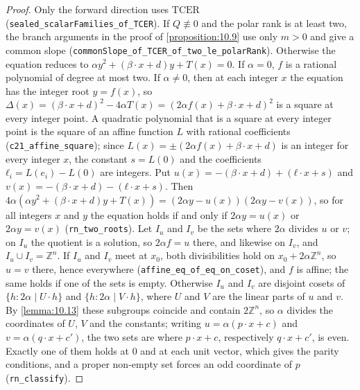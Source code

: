 \begin{proof}
Only the forward direction uses $\mathrm{TCER}$ (\texttt{sealed\_scalarFamilies\_of\_TCER}). If $Q ≢ 0$ and the polar rank is at least two, the branch arguments in the proof of \cref{proposition:10.9} use only $m > 0$ and give a common slope (\texttt{commonSlope\_of\_TCER\_of\_two\_le\_polarRank}). Otherwise the equation reduces to $αy^{2} + (β · x + d)y + T(x) = 0$. If $α = 0$, $f$ is a rational polynomial of degree at most two. If $α ≠ 0$, then at each integer $x$ the equation has the integer root $y = f(x)$, so $Δ(x) = (β · x + d)^{2} - 4αT(x) = (2αf(x) + β · x + d)^{2}$ is a square at every integer point. A quadratic polynomial that is a square at every integer point is the square of an affine function $L$ with rational coefficients (\texttt{c21\_affine\_square}); since $L(x) = ±(2αf(x) + β · x + d)$ is an integer for every integer $x$, the constant $s = L(0)$ and the coefficients $ℓ_{i} = L(e_{i}) - L(0)$ are integers. Put $u(x) = -(β · x + d) + (ℓ · x + s)$ and $v(x) = -(β · x + d) - (ℓ · x + s)$. Then $4α(αy^{2} + (β · x + d)y + T(x)) = (2αy - u(x))(2αy - v(x))$, so for all integers $x$ and $y$ the equation holds if and only if $2αy = u(x)$ or $2αy = v(x)$ (\texttt{rn\_two\_roots}). Let $I_{u}$ and $I_{v}$ be the sets where $2α$ divides $u$ or $v$; on $I_{u}$ the quotient is a solution, so $2αf = u$ there, and likewise on $I_{v}$, and $I_{u} ∪ I_{v} = ℤ^{n}$. If $I_{u}$ and $I_{v}$ meet at $x_{0}$, both divisibilities hold on $x_{0} + 2αℤ^{n}$, so $u = v$ there, hence everywhere (\texttt{affine\_eq\_of\_eq\_on\_coset}), and $f$ is affine; the same holds if one of the sets is empty. Otherwise $I_{u}$ and $I_{v}$ are disjoint cosets of $\{h : 2α ∣ U · h\}$ and $\{h : 2α ∣ V · h\}$, where $U$ and $V$ are the linear parts of $u$ and $v$. By \cref{lemma:10.13} these subgroups coincide and contain $2ℤ^{n}$, so $α$ divides the coordinates of $U$, $V$ and the constants; writing $u = α(p · x + c)$ and $v = α(q · x + c')$, the two sets are where $p · x + c$, respectively $q · x + c'$, is even. Exactly one of them holds at $0$ and at each unit vector, which gives the parity conditions, and a proper non-empty set forces an odd coordinate of $p$ (\texttt{rn\_classify}).
\end{proof}

